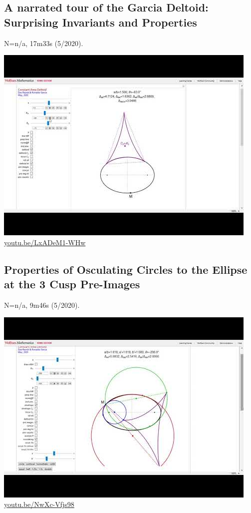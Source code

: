 \documentclass[12pt]{amsart}
\begin{document}
\subsection{A narrated tour of the Garcia Deltoid: Surprising Invariants and Properties}
\label{vid:LxADeM1-WHw}
\noindent N=n/a, 17m33s (5/2020). 
\begin{center}\includegraphics[width=.5\textwidth]{pics/LxADeM1-WHw.jpg} \\ 
\href{https://youtu.be/LxADeM1-WHw}{\url{youtu.be/LxADeM1-WHw}}\end{center}
% 

\subsection{Properties of Osculating Circles to the Ellipse at the 3 Cusp Pre-Images}
\label{vid:NwXc-Vfjs98}
\noindent N=n/a, 9m46s (5/2020). 
\begin{center}\includegraphics[width=.5\textwidth]{pics/NwXc-Vfjs98.jpg} \\ 
\href{https://youtu.be/NwXc-Vfjs98}{\url{youtu.be/NwXc-Vfjs98}}\end{center}
% 
\end{document}
